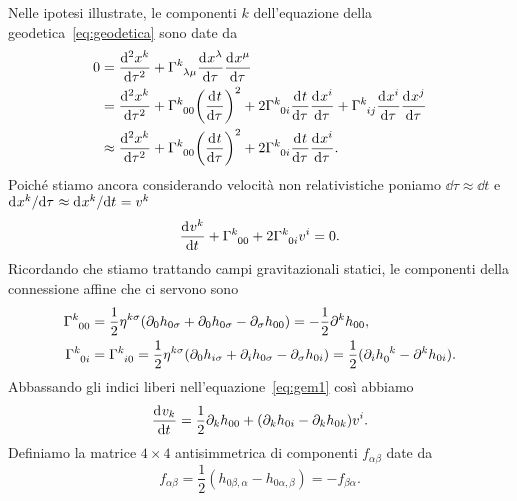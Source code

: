 Nelle ipotesi illustrate, le componenti $k$ dell'equazione della
geodetica~\eqref{eq:geodetica} sono date da
\begin{equation}
    \begin{split}
    0 &= \toder[2]{x^{k}}{\tau} + \tensor{\Gamma}{^{k}_{\lambda\mu}}
    \toder{x^{\lambda}}{\tau} \toder{x^{\mu}}{\tau} \\
    &= \toder[2]{x^{k}}{\tau} + \tensor{\Gamma}{^{k}_{00}} \bigg(
    \toder{t}{\tau} \bigg)^{2} + 2\tensor{\Gamma}{^{k}_{0i}}\toder{t}{\tau}
    \toder{x^{i}}{\tau} + \tensor{\Gamma}{^{k}_{ij}} \toder{x^{i}}{\tau}
    \toder{x^{j}}{\tau} \\
    &\approx \toder[2]{x^{k}}{\tau} + \tensor{\Gamma}{^{k}_{00}}\bigg(
    \toder{t}{\tau} \bigg)^{2} + 2\tensor{\Gamma}{^{k}_{0i}}\toder{t}{\tau}
    \toder{x^{i}}{\tau}.
  \end{split}
\end{equation}
Poiché stiamo ancora considerando velocità non relativistiche poniamo
$\dd \tau \approx \dd t$ e
$\mathrm{d}^{}x^{k} / \mathrm{d} {\tau}^{} \approx \mathrm{d}^{}x^{k} / \mathrm{d} {t}^{} = v^{k}$
\begin{equation}
  \label{eq:gem1}
  \toder{v^{k}}{t} + \tensor{\Gamma}{^{k}_{00}} +
  2\tensor{\Gamma}{^{k}_{0i}}v^{i} = 0.
\end{equation}
Ricordando che stiamo trattando campi gravitazionali statici, le componenti
della connessione affine che ci servono sono
\begin{subequations}
  \begin{align}
    \tensor{\Gamma}{^{k}_{00}} &=
    \frac{1}{2}\eta^{k\sigma}(\partial_{0}h_{0\sigma} + \partial_{0}h_{0\sigma}
    - \partial_{\sigma}h_{00}) = - \frac{1}{2}\partial^{k}h_{00}, \\
    \tensor{\Gamma}{^{k}_{0i}} &= \tensor{\Gamma}{^{k}_{i0}} =
    \frac{1}{2}\eta^{k\sigma} (\partial_{0}h_{i\sigma} + \partial_{i}h_{0\sigma}
    - \partial_{\sigma}h_{0i}) = \frac{1}{2}(\partial_{i}\tensor{h}{_{0}^{k}}
    - \partial^{k}h_{0i}).
  \end{align}
\end{subequations}
Abbassando gli indici liberi nell'equazione~\eqref{eq:gem1} così abbiamo
\begin{equation}
  \label{eq:gem2}
  \frac{{\mathop{}\!\mathrm{d}^{}}v_{k}}{\mathop{}\!\mathrm{d} {t}^{}} = \frac{1}{2}\partial_{k}h_{00} + (\partial_{k}h_{0i}
  - \partial_{k}h_{0k})v^{i}.
\end{equation}
Definiamo la matrice $4 \times 4$ antisimmetrica di componenti $f_{\alpha\beta}$
date da
\begin{equation}
  f_{\alpha\beta} = \frac{1}{2}(h_{0\beta,\alpha} - h_{0\alpha,\beta}) =
  -f_{\beta\alpha}.
\end{equation}
